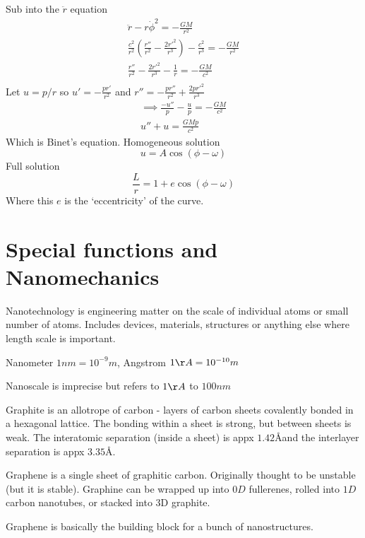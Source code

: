 \documentclass{X:/Documents/Coding/Latex/myassignment}
\begin{document}
Sub into the $\ddot r$ equation
\begin{align*}
	\ddot r - r \dot\phi^2 = -\frac{GM}{r^2}\\
	\frac{c^2}{r^2} \left(\frac{r''}{r^2} - \frac{2r'^2}{r^3}\right) - \frac{c^2}{r^3} = - \frac{GM}{r^2}\\
	\frac{r''}{r^2} - \frac{2r'^2}{r^3} - \frac{1}{r} = - \frac{GM}{c^2}\\
\end{align*}
Let $u = p/r$ so $u' = -\frac{pr'}{r^2}$ and $r'' = -\frac{pr''}{r^2} + \frac{2pr'^2}{r^3}$
\begin{align*}
\implies \frac{-u''}{p} - \frac{u}{p} = -\frac{GM}{c^2}	\\
u'' + u = \frac{GMp}{c^2}
\end{align*}
Which is Binet's equation.
Homogeneous solution
\[u = A\cos(\phi - \omega)\]
Full solution
\[\frac{L}{r} = 1 + e\cos(\phi - \omega)\]
Where this $e$ is the `eccentricity' of the curve.






\section{Special functions and Nanomechanics}
Nanotechnology is engineering matter on the scale of individual atoms or small number of atoms. Includes devices, materials, structures or anything else where length scale is important.

Nanometer $1nm = 10^{-9} m$, Angstrom $1 \AA = 10^{-10} m$

Nanoscale is imprecise but refers to $1\AA$ to $100nm$

Graphite is an allotrope of carbon - layers of carbon sheets covalently bonded in a hexagonal lattice. The bonding within a sheet is strong, but between sheets is weak.
The interatomic separation (inside a sheet) is appx $1.42$\AA  and the interlayer separation is appx $3.35$\AA.

Graphene is a single sheet of graphitic carbon. Originally thought to be unstable (but it is stable). Graphine can be wrapped up into $0D$ fullerenes, rolled into $1D$ carbon nanotubes, or stacked into $3$D graphite.

Graphene is basically the building block for a bunch of nanostructures.
\end{document}
